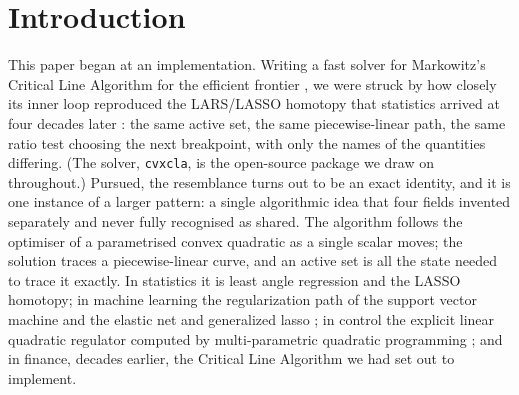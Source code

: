\documentclass[sts]{imsart}
\theoremstyle{plain}
\theoremstyle{definition}
\begin{document}
\begin{frontmatter}
\begin{keyword}
\end{keyword}

\begin{keyword}[class=MSC2020]
\end{keyword}

\end{frontmatter}

\section{Introduction}

This paper began at an implementation. Writing a fast solver for Markowitz's Critical
Line Algorithm for the efficient frontier \citep{markowitz1956, markowitz1959}, we were
struck by how closely its inner loop reproduced the LARS/LASSO homotopy that statistics
arrived at four decades later \citep{tibshirani1996, osborne2000, efron2004}: the same
active set, the same piecewise-linear path, the same ratio test choosing the next
breakpoint, with only the names of the quantities differing. (The solver, \texttt{cvxcla},
is the open-source package we draw on throughout.) Pursued, the resemblance turns out to be an exact identity, and it is one
instance of a larger pattern: a single algorithmic idea that four fields invented
separately and never fully recognised as shared. The algorithm follows the optimiser of
a parametrised convex quadratic as a single scalar moves; the solution traces a
piecewise-linear curve, and an active set is all the state needed to trace it
exactly. In statistics it is least angle regression and the LASSO homotopy; in machine
learning the regularization path of the support vector machine \citep{hastie2004svm} and
the elastic net and generalized lasso \citep{zou2005, tibshirani2011}; in control the
explicit linear quadratic regulator computed by multi-parametric quadratic programming
\citep{bemporad2002, tondel2003}; and in finance, decades earlier, the Critical Line
Algorithm we had set out to implement.
\end{document}
